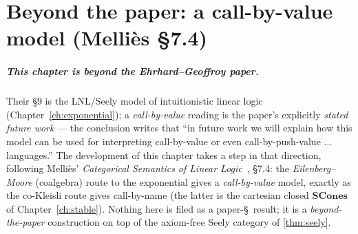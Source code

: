 %

\chapter{Beyond the paper: a call-by-value model (Melli\`es \S7.4)}%
\label{ch:cbv}

\paragraph{This chapter is beyond the Ehrhard--Geoffroy paper.}
Their \S9 is the LNL/Seely model of intuitionistic linear logic
(Chapter~\ref{ch:exponential}); a \emph{call-by-value} reading is the
paper's explicitly \emph{stated future work} --- the conclusion writes
that ``in future work we will explain how this model can be used for
interpreting call-by-value or even call-by-push-value $\ldots$
languages.'' The development of this chapter takes a step in that
direction, following Melli\`es' \emph{Categorical Semantics of Linear
Logic}~\cite{mellies-categorical-semantics}, \S7.4: the
\emph{Eilenberg--Moore} (coalgebra) route to the exponential gives a
\emph{call-by-value} model, exactly as the co-Kleisli route gives
call-by-name (the latter is the cartesian closed $\mathbf{SCones}$ of
Chapter~\ref{ch:stable}). Nothing here is filed as a paper-\S\ result; it
is a \emph{beyond-the-paper} construction on top of the axiom-free Seely
category of \autoref{thm:seely}.

